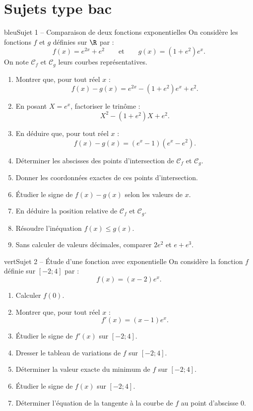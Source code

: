 
\section{Sujets type bac}


\begin{exoBox}{bleu}{Sujet 1 -- Comparaison de deux fonctions exponentielles}
On considère les fonctions $f$ et $g$ définies sur $\R$ par :
\[
f(x)=e^{2x}+e^2
\qquad\text{et}\qquad
g(x)=(1+e^2)e^x.
\]
On note $\mathcal C_f$ et $\mathcal C_g$ leurs courbes représentatives.
\begin{enumerate}
\item Montrer que, pour tout réel $x$ :
\[
f(x)-g(x)=e^{2x}-(1+e^2)e^x+e^2.
\]
\item En posant $X=e^x$, factoriser le trinôme :
\[
X^2-(1+e^2)X+e^2.
\]
\item En déduire que, pour tout réel $x$ :
\[
f(x)-g(x)=(e^x-1)(e^x-e^2).
\]
\item Déterminer les abscisses des points d'intersection de $\mathcal C_f$ et $\mathcal C_g$.
\item Donner les coordonnées exactes de ces points d'intersection.
\item Étudier le signe de $f(x)-g(x)$ selon les valeurs de $x$.
\item En déduire la position relative de $\mathcal C_f$ et $\mathcal C_g$.
\item Résoudre l'inéquation $f(x)\le g(x)$.
\item Sans calculer de valeurs décimales, comparer $2e^2$ et $e+e^3$.
\end{enumerate}
\end{exoBox}

\begin{exoBox}{vert}{Sujet 2 -- Étude d'une fonction avec exponentielle}
On considère la fonction $f$ définie sur $[-2;4]$ par :
\[
f(x)=(x-2)e^x.
\]
\begin{enumerate}
\item Calculer $f(0)$.
\item Montrer que, pour tout réel $x$ :
\[
f'(x)=(x-1)e^x.
\]
\item Étudier le signe de $f'(x)$ sur $[-2;4]$.
\item Dresser le tableau de variations de $f$ sur $[-2;4]$.
\item Déterminer la valeur exacte du minimum de $f$ sur $[-2;4]$.
\item Étudier le signe de $f(x)$ sur $[-2;4]$.
\item Déterminer l'équation de la tangente à la courbe de $f$ au point d'abscisse $0$.
\end{enumerate}
\end{exoBox}

